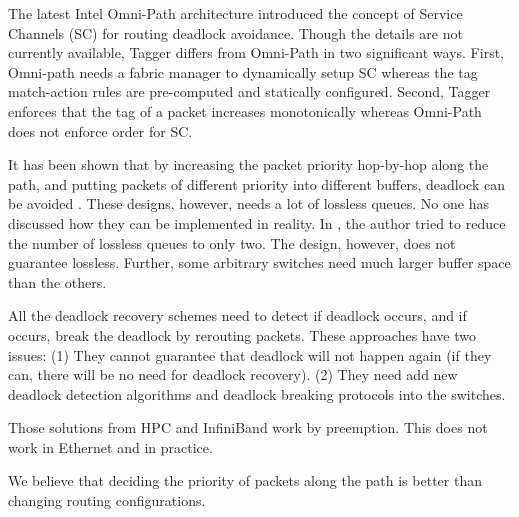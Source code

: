 The latest Intel Omni-Path architecture \cite{omnipath} introduced the concept of Service Channels (SC) for routing deadlock avoidance. Though the details are not currently available, Tagger differs from Omni-Path in two significant ways. First, Omni-path needs a fabric manager to dynamically setup SC whereas the tag match-action rules are pre-computed and statically configured. Second, Tagger enforces that the tag of a packet increases monotonically whereas Omni-Path does not enforce order for SC.

 It has been shown that by increasing the packet priority hop-by-hop along the path, and putting packets of different priority into different buffers, deadlock can be avoided \cite{firstpaper,survey,datanetworks,karol2003prevention}. These designs, however, needs a lot of lossless queues. No one
has discussed how they can be implemented in reality. In \cite{dag}, the author tried to reduce the number of lossless queues to only two. The design, however, does not guarantee lossless. Further, some arbitrary switches need much larger buffer space than the others.

All the deadlock recovery schemes \cite{isca95,shpiner2016unlocking,venkatramani1996,martinez1997,Lopez1998} need to detect if deadlock occurs, and if occurs, break the deadlock by rerouting packets. These approaches have two issues: (1) They cannot guarantee that deadlock will not happen again (if they can, there will be no need for deadlock recovery). (2) They need add new deadlock detection algorithms and deadlock breaking protocols into the switches.

 Those solutions from HPC and InfiniBand
work by preemption. This does not work in Ethernet and in practice.

We believe that deciding the priority of packets along the path is better than changing
routing configurations.
